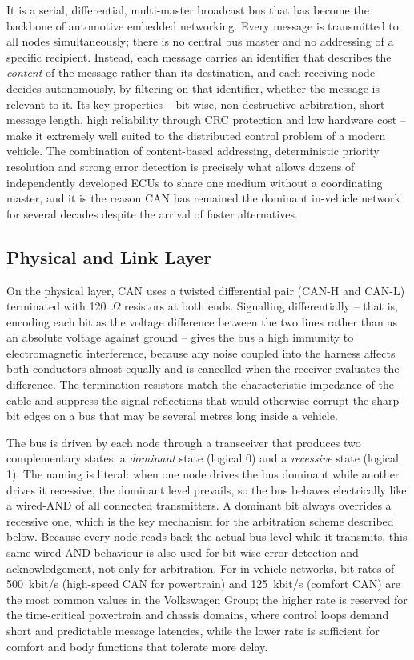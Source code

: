 \documentclass[11pt,a4paper,oneside,parskip=half]{scrreprt}
\begin{document}
It is a serial, differential, multi-master broadcast bus that has become the backbone of automotive embedded networking. Every message is transmitted to all nodes simultaneously; there is no central bus master and no addressing of a specific recipient. Instead, each message carries an identifier that describes the \emph{content} of the message rather than its destination, and each receiving node decides autonomously, by filtering on that identifier, whether the message is relevant to it. Its key properties -- bit-wise, non-destructive arbitration, short message length, high reliability through CRC protection and low hardware cost -- make it extremely well suited to the distributed control problem of a modern vehicle. The combination of content-based addressing, deterministic priority resolution and strong error detection is precisely what allows dozens of independently developed ECUs to share one medium without a coordinating master, and it is the reason CAN has remained the dominant in-vehicle network for several decades despite the arrival of faster alternatives.

\subsection{Physical and Link Layer}
On the physical layer, CAN uses a twisted differential pair (CAN-H and CAN-L) terminated with 120~$\Omega$ resistors at both ends. Signalling differentially -- that is, encoding each bit as the voltage difference between the two lines rather than as an absolute voltage against ground -- gives the bus a high immunity to electromagnetic interference, because any noise coupled into the harness affects both conductors almost equally and is cancelled when the receiver evaluates the difference. The termination resistors match the characteristic impedance of the cable and suppress the signal reflections that would otherwise corrupt the sharp bit edges on a bus that may be several metres long inside a vehicle.

The bus is driven by each node through a transceiver that produces two complementary states: a \textit{dominant} state (logical 0) and a \textit{recessive} state (logical 1). The naming is literal: when one node drives the bus dominant while another drives it recessive, the dominant level prevails, so the bus behaves electrically like a wired-AND of all connected transmitters. A dominant bit always overrides a recessive one, which is the key mechanism for the arbitration scheme described below. Because every node reads back the actual bus level while it transmits, this same wired-AND behaviour is also used for bit-wise error detection and acknowledgement, not only for arbitration. For in-vehicle networks, bit rates of 500~kbit/s (high-speed CAN for powertrain) and 125~kbit/s (comfort CAN) are the most common values in the Volkswagen Group; the higher rate is reserved for the time-critical powertrain and chassis domains, where control loops demand short and predictable message latencies, while the lower rate is sufficient for comfort and body functions that tolerate more delay.
\end{document}
